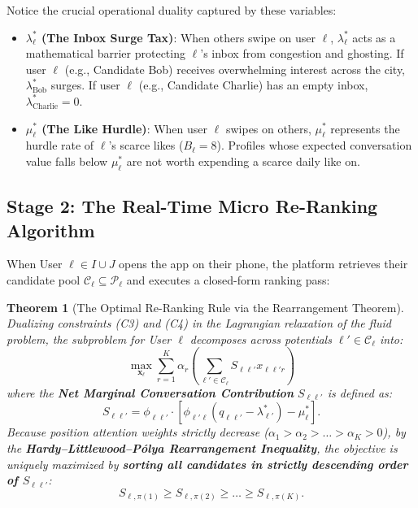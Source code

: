 \documentclass[11pt,letterpaper]{article}
\theoremstyle{definition}
\theoremstyle{plain}
\newtheorem{theorem}{Theorem}[section]
\theoremstyle{remark}
\begin{document}
Notice the crucial operational duality captured by these variables:
\begin{itemize}[leftmargin=2em]
    \item \textbf{$\lambda_\ell^*$ (The Inbox Surge Tax)}: When others swipe on user $\ell$, $\lambda_\ell^*$ acts as a mathematical barrier protecting $\ell$'s inbox from congestion and ghosting. If user $\ell$ (e.g., Candidate Bob) receives overwhelming interest across the city, $\lambda_{\text{Bob}}^*$ surges. If user $\ell$ (e.g., Candidate Charlie) has an empty inbox, $\lambda_{\text{Charlie}}^* = 0$.
    \item \textbf{$\mu_\ell^*$ (The Like Hurdle)}: When user $\ell$ swipes on others, $\mu_\ell^*$ represents the hurdle rate of $\ell$'s scarce likes ($B_\ell = 8$). Profiles whose expected conversation value falls below $\mu_\ell^*$ are not worth expending a scarce daily like on.
\end{itemize}

\subsection{Stage 2: The Real-Time Micro Re-Ranking Algorithm}
When User $\ell \in I \cup J$ opens the app on their phone, the platform retrieves their candidate pool $\mathcal{C}_\ell \subseteq \mathcal{P}_\ell$ and executes a closed-form ranking pass:

\begin{theorem}[The Optimal Re-Ranking Rule via the Rearrangement Theorem]
\label{thm:rearrangement}
Dualizing constraints (C3) and (C4) in the Lagrangian relaxation of the fluid problem, the subproblem for User $\ell$ decomposes across potentials $\ell' \in \mathcal{C}_\ell$ into:
\begin{equation}
    \max_{\mathbf{x}_\ell} \sum_{r=1}^K \alpha_r \left( \sum_{\ell' \in \mathcal{C}_\ell} S_{\ell\ell'} x_{\ell\ell' r} \right)
\end{equation}
where the \textbf{Net Marginal Conversation Contribution} $S_{\ell\ell'}$ is defined as:
\begin{equation}
    S_{\ell\ell'} = \phi_{\ell\ell'} \cdot \left[ \phi_{\ell'\ell} (q_{\ell\ell'} - \lambda_{\ell'}^*) - \mu_\ell^* \right].
\end{equation}
Because position attention weights strictly decrease ($\alpha_1 > \alpha_2 > \dots > \alpha_K > 0$), by the \textbf{Hardy--Littlewood--P\'olya Rearrangement Inequality}, the objective is uniquely maximized by \textbf{sorting all candidates in strictly descending order of $S_{\ell\ell'}$}:
\begin{equation}
    S_{\ell, \pi(1)} \ge S_{\ell, \pi(2)} \ge \dots \ge S_{\ell, \pi(K)}.
\end{equation}
\end{theorem}
\end{document}
